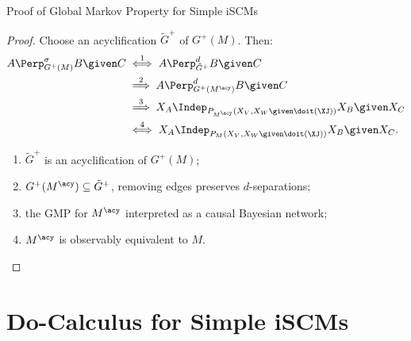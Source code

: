 \begin{frame}{Proof of Global Markov Property for Simple iSCMs}
\begin{proof}
  \setlength\abovedisplayskip{10pt}
  \setlength\belowdisplayskip{0pt}
  Choose an acyclification $\tilde{G}^+$ of $G^+(M)$. Then:
  \begin{align*}
    A \Perp^\sigma_{G^+(M)} B \given C &\stackrel{1}{\iff} A \Perp^d_{\tilde{G}^+} B \given C \\
    &\stackrel{2}{\implies} A \Perp^d_{G^+(M^\acy)} B \given C \\
    &\stackrel{3}{\implies} X_A \Indep_{P_{M^{\acy}}(X_V,X_W \given \doit(\XJ))} X_B \given X_C \\
    &\stackrel{4}{\iff} X_A \Indep_{P_{M}(X_V,X_W \given \doit(\XJ))} X_B \given X_C.
  \end{align*}
  \begin{enumerate}
    \item $\tilde{G}^+$ is an acyclification of $G^+(M)$; 
    \item $G^+(M^\acy) \subseteq \tilde{G}^+$, removing edges preserves $d$-separations; 
    \item the GMP for $M^\acy$ interpreted as a causal Bayesian network;
    \item $M^\acy$ is observably equivalent to $M$.
  \end{enumerate}
\end{proof}
\end{frame}

\part{Do-Calculus for Simple iSCMs}
\frame{\partpage}

